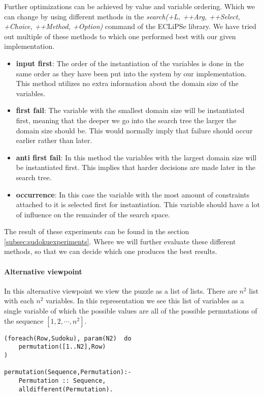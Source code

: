 Further optimizations can be achieved by value and variable ordering.
Which we can change by using different methods in the \textsl{search(+L, ++Arg, ++Select, +Choice, ++Method, +Option)} command of the ECLiPSe library. 
We have tried out multiple of these methods to which one performed best with our given implementation.
\begin{itemize}
\item \textbf{input first}: The order of the instantiation of the variables is done in the same order as they have been put into the system by our implementation. This method utilizes no extra information about the domain size of the variables.
\item \textbf{first fail}: The variable with the smallest domain size will be instantiated first, meaning that the deeper we go into the search tree the larger the domain size should be. This would normally imply that failure should occur earlier rather than later. 
\item \textbf{anti first fail}: In this method the variables with the largest domain size will be instantiated first. This implies that harder decisions are made later in the search tree.
\item \textbf{occurrence}: In this case the variable with the most amount of constraints attached to it is selected first for instantiation. This variable should have a lot of influence on the remainder of the search space. 
\end{itemize}

The result of these experiments can be found in the section \ref{subsec:sudokuexperiments}.
Where we will further evaluate these different methods, so that we can decide which one produces the best results.

\paragraph*{Alternative viewpoint}

In this alternative viewpoint we view the puzzle as a list of lists.
There are $n^2$ list with each $n^{2}$ variables.
In this representation we see this list of variables as a single variable of which the possible values are all of the possible permutations of the sequence $[1,2,\cdots,n^{2}]$. \\

\begin{lstlisting}
(foreach(Row,Sudoku), param(N2)  do
	permutation([1..N2],Row)
)

permutation(Sequence,Permutation):-
	Permutation :: Sequence,
	alldifferent(Permutation).
\end{lstlisting}

